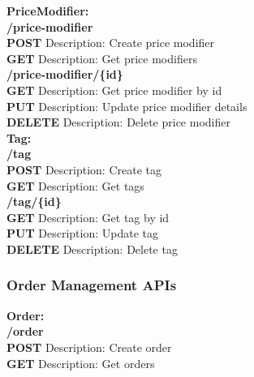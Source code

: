 \documentclass[11pt,a4paper,pdftex]{article}
\begin{document}
\textbf{PriceModifier:}\\
\hspace*{1em}\textbf{/price-modifier}\\
\hspace*{2em}\textbf{POST} Description: Create price modifier\\
\hspace*{2em}\textbf{GET} Description: Get price modifiers\\

\hspace*{1em}\textbf{/price-modifier/\{\textbf{id}\}}\\
\hspace*{2em}\textbf{GET} Description: Get price modifier by id\\
\hspace*{2em}\textbf{PUT} Description: Update price modifier details\\
\hspace*{2em}\textbf{DELETE} Description: Delete price modifier\\


\textbf{Tag:}\\
\hspace*{1em}\textbf{/tag}\\
\hspace*{2em}\textbf{POST} Description: Create tag\\
\hspace*{2em}\textbf{GET} Description: Get tags\\

\hspace*{1em}\textbf{/tag/\{\textbf{id}\}}\\
\hspace*{2em}\textbf{GET} Description: Get tag by id\\
\hspace*{2em}\textbf{PUT} Description: Update tag\\
\hspace*{2em}\textbf{DELETE} Description: Delete tag\\


\subsubsection{Order Management APIs}
\textbf{Order:}\\
\hspace*{1em}\textbf{/order}\\
\hspace*{2em}\textbf{POST} Description: Create order\\
\hspace*{2em}\textbf{GET} Description: Get orders\\
\end{document}
